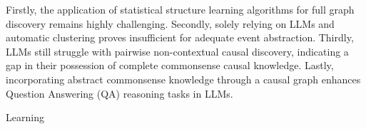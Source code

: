 Firstly, the application of statistical structure learning algorithms for full graph discovery remains highly challenging. Secondly, solely relying on LLMs and automatic clustering proves insufficient for adequate event abstraction. Thirdly, LLMs still struggle with pairwise non-contextual causal discovery, indicating a gap in their possession of complete commonsense causal knowledge. Lastly, incorporating abstract commonsense knowledge through a causal graph enhances Question Answering (QA) reasoning tasks in LLMs.  


Learning 



